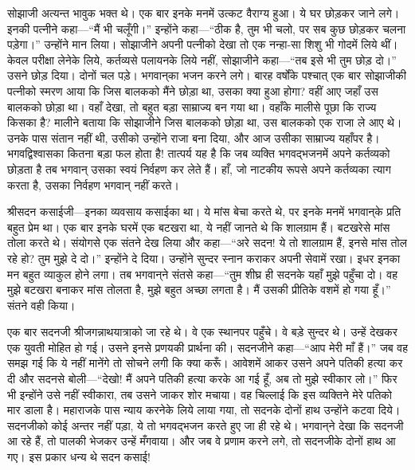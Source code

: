 \begin{sloppypar}\justifying{}
सोझाजी अत्यन्त भावुक भक्त थे। एक बार इनके मनमें उत्कट वैराग्य हुआ। ये घर छोड़कर जाने लगे। इनकी पत्नीने कहा—“मैं भी चलूँगी।” इन्होंने कहा—“ठीक है, तुम भी चलो, पर सब कुछ छोड़कर चलना पड़ेगा।” उन्होंने मान लिया। सोझाजीने अपनी पत्नीको देखा तो एक नन्हा-सा शिशु भी गोदमें लिये थीं। केवल परीक्षा लेनेके लिये, कर्तव्यसे पलायनके लिये नहीं, सोझाजीने कहा—“तब इसे भी तुम छोड़ दो।” उसने छोड़ दिया। दोनों चल पड़े। भगवान्‌‌का भजन करने लगे। बारह वर्षोंके पश्चात् एक बार सोझाजीकी पत्नीको स्मरण आया कि जिस बालकको मैंने छोड़ा था, उसका क्या हुआ होगा? वहीं आए जहाँ उस बालकको छोड़ा था। वहाँ देखा, तो बहुत बड़ा साम्राज्य बन गया था। वहाँके मालीसे पूछा कि राज्य किसका है? मालीने बताया कि सोझाजीने जिस बालकको छोड़ा था, उस बालकको एक राजा ले आए थे। उनके पास संतान नहीं थी, उसीको उन्होंने राजा बना दिया, और आज उसीका साम्राज्य यहाँपर है। भगवद्विश्वासका कितना बड़ा फल होता है! तात्पर्य यह है कि जब व्यक्ति भगवद्भजनमें अपने कर्तव्यको छोड़ता है तब भगवान् उसका स्वयं निर्वहण कर लेते हैं। हाँ, जो नाटकीय रूपसे अपने कर्तव्यका त्याग करता है, उसका निर्वहण भगवान् नहीं करते।
\end{sloppypar}
\begin{sloppypar}\justifying{}
श्रीसदन कसाईजी—इनका व्यवसाय कसाईका था। ये मांस बेचा करते थे, पर इनके मनमें भगवान्‌के प्रति बहुत प्रेम था। एक बार इनके घरमें एक बटखरा था, ये नहीं जानते थे कि शालग्राम हैं। बटखरेसे मांस तोला करते थे। संयोगसे एक संतने देख लिया और कहा—“अरे सदन! ये तो शालग्राम हैं, इनसे मांस तोल रहे हो? तुम मुझे दे दो।” इन्होंने दे दिया। उन्होंने सुन्दर स्नान कराकर अपनी सेवामें रखा। इधर इनका मन बहुत व्याकुल होने लगा। तब भगवान्‌ने संतसे कहा—“तुम शीघ्र ही सदनके यहाँ मुझे पहुँचा दो। वह मुझे बटखरा बनाकर मांस तोलता है, मुझे बहुत अच्छा लगता है। मैं उसकी प्रीतिके वशमें हो गया हूँ।” संतने वही किया।
\end{sloppypar}
\begin{sloppypar}\justifying{}
एक बार सदनजी श्रीजगन्नाथ\-यात्राको जा रहे थे। वे एक स्थानपर पहुँचे। वे बड़े सुन्दर थे। उन्हें देखकर एक युवती मोहित हो गई। उसने इनसे प्रणयकी प्रार्थना की। सदनजीने कहा—“आप मेरी माँ हैं।” जब वह समझ गई कि ये नहीं मानेंगे तो सोचने लगी कि क्या करूँ। आवेशमें आकर उसने अपने पतिकी हत्या कर दी और सदनसे बोली—“देखो! मैं अपने पतिकी हत्या करके आ गई हूँ, अब तो मुझे स्वीकार लो।” फिर भी इन्होंने उसे नहीं स्वीकारा, तब उसने जाकर शोर मचाया। वह चिल्लाई कि इस व्यक्तिने मेरे पतिको मार डाला है। महाराजके पास न्याय करनेके लिये लाया गया, तो सदनके दोनों हाथ उन्होंने कटवा दिये। सदनजीको कोई अन्तर नहीं पड़ा, ये तो भगवद्भजन करते हुए जा ही रहे थे। भगवान्‌ने देखा कि सदनजी आ रहे हैं, तो पालकी भेजकर उन्हें मँगवाया। और जब वे प्रणाम करने लगे, तो सदनजीके दोनों हाथ आ गए। इस प्रकार धन्य थे सदन कसाई!
\end{sloppypar}

